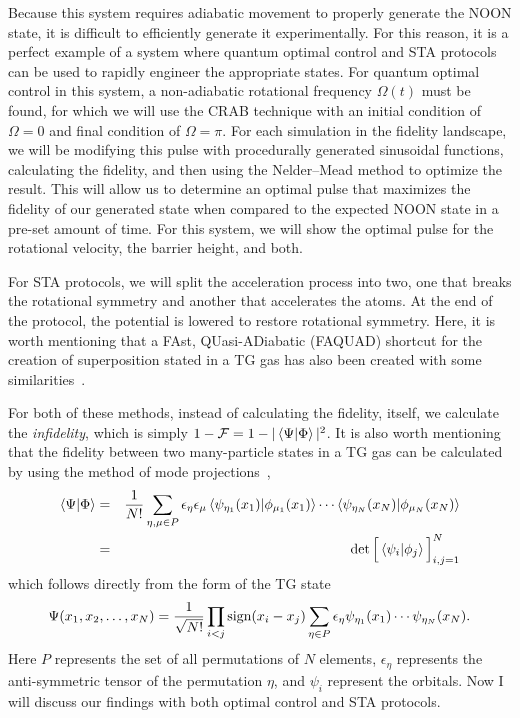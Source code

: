 Because this system requires adiabatic movement to properly generate the NOON state, it is difficult to efficiently generate it experimentally.
For this reason, it is a perfect example of a system where quantum optimal control and STA protocols can be used to rapidly engineer the appropriate states.
For quantum optimal control in this system, a non-adiabatic rotational frequency $\Omega(t)$ must be found, for which we will use the CRAB technique with an initial condition of $\Omega = 0$ and final condition of $\Omega = \pi$.
For each simulation in the fidelity landscape, we will be modifying this pulse with procedurally generated sinusoidal functions, calculating the fidelity, and then using the Nelder--Mead method to optimize the result.
This will allow us to determine an optimal pulse that maximizes the fidelity of our generated state when compared to the expected NOON state in a pre-set amount of time.
For this system, we will show the optimal pulse for the rotational velocity, the barrier height, and both.

For STA protocols, we will split the acceleration process into two, one that breaks the rotational symmetry and another that accelerates the atoms.
At the end of the protocol, the potential is lowered to restore rotational symmetry.
Here, it is worth mentioning that a FAst, QUasi-ADiabatic (FAQUAD) shortcut for the creation of superposition stated in a TG gas has also been created with some similarities~\cite{garaot2015}.

For both of these methods, instead of calculating the fidelity, itself, we calculate the \textit{infidelity}, which is simply $1-\mathcal{F} = 1-|\braket{\Psi|\Phi}|^2$.
It is also worth mentioning that the fidelity between two many-particle states in a TG gas can be calculated by using the method of mode projections~\cite{campo2011,lelas2011},
\begin{eqnarray}
\braket{\Psi | \Phi} &=& \frac1{N!} \sum_{\eta, \mu \in P} \epsilon_\eta \epsilon_\mu \braket{\psi_{\eta_1}(x_1) | \phi_{\mu_1}(x_1) } \cdots \braket{ \psi_{\eta_N}(x_N) | \phi_{\mu_N}(x_N) } \nonumber \\
\label{eq:fid}
&=&
\det \Big[ \braket{\psi_i | \phi_j }\Big]_{i,j=1}^N
\end{eqnarray}
which follows directly from the form of the TG state~\cite{girardeau1960}
\begin{equation}
\Psi(x_1,x_2,\ldots, x_N)= \frac1{\sqrt{N!}} \prod_{i<j}\textnormal{sign}(x_i-x_j) \sum_{\eta \in P} \epsilon_\eta \psi_{\eta_1}(x_1)\cdots\psi_{\eta_N}(x_N).
\label{eq:TG}
\end{equation}
Here $P$ represents the set of all permutations of $N$ elements, $\epsilon_\eta$ represents the anti-symmetric tensor of the permutation $\eta$, and $\psi_i$ represent the orbitals.
Now I will discuss our findings with both optimal control and STA protocols.


